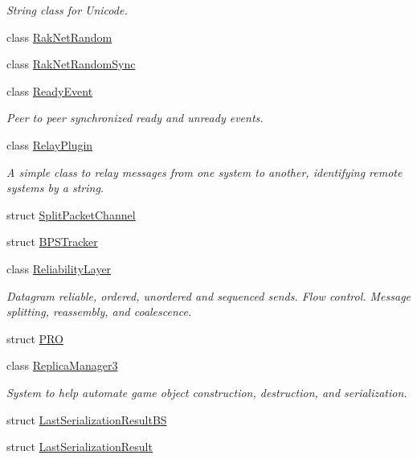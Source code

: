 \begin{DoxyCompactItemize}
\begin{DoxyCompactList}\small\item\em String class for Unicode. \end{DoxyCompactList}\item 
class \hyperlink{class_rak_net_1_1_rak_net_random}{Rak\-Net\-Random}
\item 
class \hyperlink{class_rak_net_1_1_rak_net_random_sync}{Rak\-Net\-Random\-Sync}
\item 
class \hyperlink{class_rak_net_1_1_ready_event}{Ready\-Event}
\begin{DoxyCompactList}\small\item\em Peer to peer synchronized ready and unready events. \end{DoxyCompactList}\item 
class \hyperlink{class_rak_net_1_1_relay_plugin}{Relay\-Plugin}
\begin{DoxyCompactList}\small\item\em A simple class to relay messages from one system to another, identifying remote systems by a string. \end{DoxyCompactList}\item 
struct \hyperlink{struct_rak_net_1_1_split_packet_channel}{Split\-Packet\-Channel}
\item 
struct \hyperlink{struct_rak_net_1_1_b_p_s_tracker}{B\-P\-S\-Tracker}
\item 
class \hyperlink{class_rak_net_1_1_reliability_layer}{Reliability\-Layer}
\begin{DoxyCompactList}\small\item\em Datagram reliable, ordered, unordered and sequenced sends. Flow control. Message splitting, reassembly, and coalescence. \end{DoxyCompactList}\item 
struct \hyperlink{struct_rak_net_1_1_p_r_o}{P\-R\-O}
\item 
class \hyperlink{class_rak_net_1_1_replica_manager3}{Replica\-Manager3}
\begin{DoxyCompactList}\small\item\em System to help automate game object construction, destruction, and serialization. \end{DoxyCompactList}\item 
struct \hyperlink{struct_rak_net_1_1_last_serialization_result_b_s}{Last\-Serialization\-Result\-B\-S}
\item 
struct \hyperlink{struct_rak_net_1_1_last_serialization_result}{Last\-Serialization\-Result}

\end{DoxyCompactItemize}
